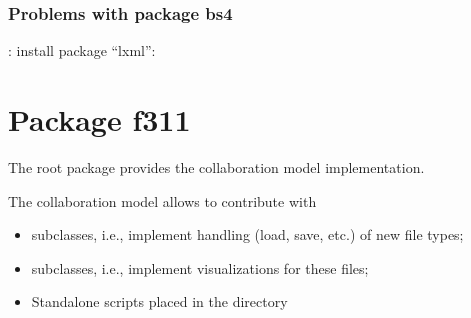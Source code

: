 \documentclass[letterpaper,10pt,english]{sphinxmanual}
\begin{document}
\subsection{Problems with package bs4}
\label{\detokenize{install:problems-with-package-bs4}}
\begin{sphinxVerbatim}[commandchars=\\\{\}]
 
\end{sphinxVerbatim}

: install package “lxml”: 


\chapter{Package f311}
\label{\detokenize{f3110::doc}}\label{\detokenize{f3110:package-f311}}
The root package provides the collaboration model implementation.

The collaboration model allows  to contribute with
\begin{itemize}
\item {} 
 subclasses, i.e., implement handling (load, save, etc.) of new file types;

\item {} 
 subclasses, i.e., implement visualizations for these files;

\item {} 
Standalone scripts placed in the directory 

\end{itemize}
\end{document}
